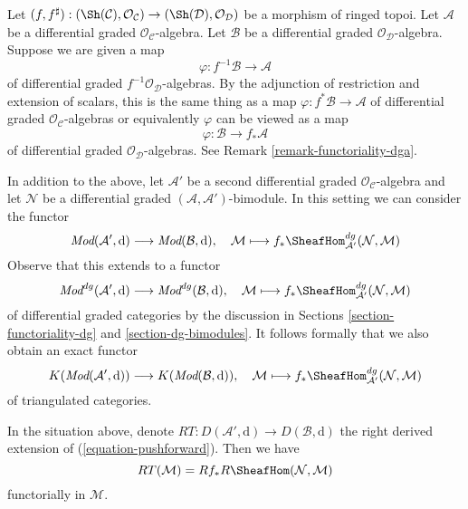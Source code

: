\medskip\noindent
Let $(f, f^\sharp) : (\Sh(\mathcal{C}), \mathcal{O}_\mathcal{C})
\to (\Sh(\mathcal{D}), \mathcal{O}_\mathcal{D})$
be a morphism of ringed topoi. Let $\mathcal{A}$ be a differential
graded $\mathcal{O}_\mathcal{C}$-algebra. Let $\mathcal{B}$ be a
differential graded $\mathcal{O}_\mathcal{D}$-algebra.
Suppose we are given a map
$$
\varphi : f^{-1}\mathcal{B} \to \mathcal{A}
$$
of differential graded $f^{-1}\mathcal{O}_\mathcal{D}$-algebras.
By the adjunction of restriction and extension of scalars, this
is the same thing as a map $\varphi : f^*\mathcal{B} \to \mathcal{A}$
of differential graded $\mathcal{O}_\mathcal{C}$-algebras or equivalently
$\varphi$ can be viewed as a map
$$
\varphi : \mathcal{B} \to f_*\mathcal{A}
$$
of differential graded $\mathcal{O}_\mathcal{D}$-algebras.
See Remark \ref{remark-functoriality-dga}.

\medskip\noindent
In addition to the above, let $\mathcal{A}'$ be a second differential
graded $\mathcal{O}_\mathcal{C}$-algebra and let $\mathcal{N}$
be a differential graded $(\mathcal{A}, \mathcal{A}')$-bimodule.
In this setting we can consider the functor
$$
\textit{Mod}(\mathcal{A}', \text{d})
\longrightarrow
\textit{Mod}(\mathcal{B}, \text{d}),\quad
\mathcal{M} \longmapsto
f_*\SheafHom^{dg}_{\mathcal{A}'}(\mathcal{N}, \mathcal{M})
$$
Observe that this extends to a functor
$$
\textit{Mod}^{dg}(\mathcal{A}', \text{d})
\longrightarrow
\textit{Mod}^{dg}(\mathcal{B}, \text{d}),\quad
\mathcal{M} \longmapsto
f_*\SheafHom^{dg}_{\mathcal{A}'}(\mathcal{N}, \mathcal{M})
$$
of differential graded categories by the discussion in
Sections \ref{section-functoriality-dg} and \ref{section-dg-bimodules}.
It follows formally that we also obtain an exact functor
\begin{equation}
\label{equation-pushforward}
K(\textit{Mod}(\mathcal{A}', \text{d}))
\longrightarrow
K(\textit{Mod}(\mathcal{B}, \text{d})),\quad
\mathcal{M} \longmapsto
f_*\SheafHom^{dg}_{\mathcal{A}'}(\mathcal{N}, \mathcal{M})
\end{equation}
of triangulated categories.

\begin{lemma}
\label{lemma-compose-pushforward-hom}
In the situation above, denote $RT : D(\mathcal{A}', \text{d}) \to
D(\mathcal{B}, \text{d})$ the right derived extension of
(\ref{equation-pushforward}). Then we have
$$
RT(\mathcal{M}) = Rf_* R\SheafHom(\mathcal{N}, \mathcal{M})
$$
functorially in $\mathcal{M}$.
\end{lemma}

